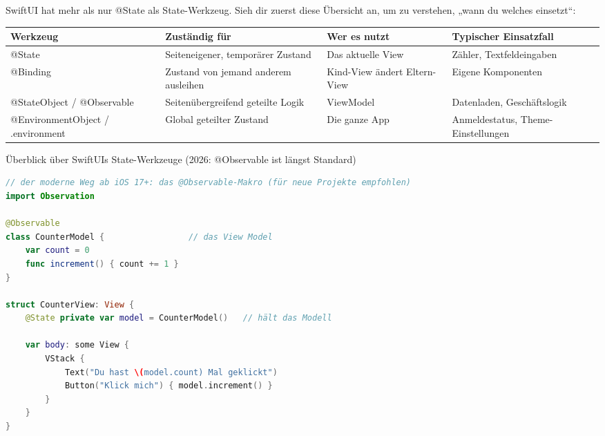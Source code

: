


SwiftUI hat mehr als nur @State als State-Werkzeug. Sieh dir zuerst diese Übersicht an, um zu verstehen, „wann du welches einsetzt“:

\begin{center}
\begin{tabularx}{\linewidth}{|X|X|X|X|}
\hline
\textbf{Werkzeug} & \textbf{Zuständig für} & \textbf{Wer es nutzt} & \textbf{Typischer Einsatzfall} \tabularnewline
\hline
@State & Seiteneigener, temporärer Zustand & Das aktuelle View & Zähler, Textfeldeingaben \tabularnewline
@Binding & Zustand von jemand anderem ausleihen & Kind-View ändert Eltern-View & Eigene Komponenten \tabularnewline
@StateObject / @Observable & Seitenübergreifend geteilte Logik & ViewModel & Datenladen, Geschäftslogik \tabularnewline
@EnvironmentObject / .environment & Global geteilter Zustand & Die ganze App & Anmeldestatus, Theme-Einstellungen \tabularnewline
\hline
\end{tabularx}
\end{center}

\begin{center}\small\color{gray}Überblick über SwiftUIs State-Werkzeuge (2026: @Observable ist längst Standard)\end{center}

\begin{lstlisting}[language=Swift]
// der moderne Weg ab iOS 17+: das @Observable-Makro (für neue Projekte empfohlen)
import Observation

@Observable
class CounterModel {                 // das View Model
    var count = 0
    func increment() { count += 1 }
}

struct CounterView: View {
    @State private var model = CounterModel()   // hält das Modell

    var body: some View {
        VStack {
            Text("Du hast \(model.count) Mal geklickt")
            Button("Klick mich") { model.increment() }
        }
    }
}
\end{lstlisting}

